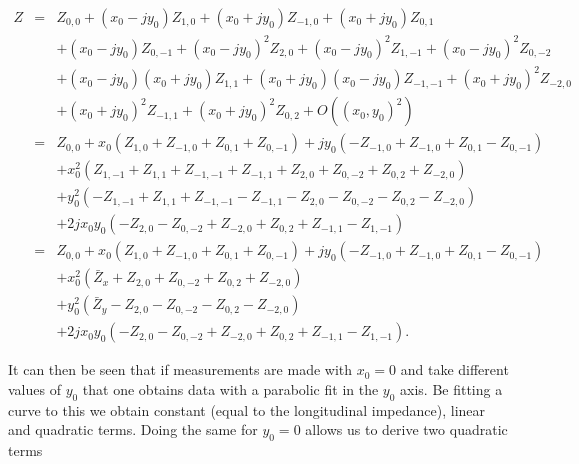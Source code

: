 \begin{align}
Z &=&Z_{0,0} +  \left( x_{0} - jy_{0} \right) Z_{1,0} + \left( x_{0} + jy_{0} \right)  Z_{-1,0} + \left( x_{0} + jy_{0} \right) Z_{0,1} \nonumber \\
   &   &+ \left( x_{0} - jy_{0} \right) Z_{0,-1} + \left( x_{0} - jy_{0} \right)^{2} Z_{2,0} + \left( x_{0} - jy_{0} \right)^{2} Z_{1,-1} + \left( x_{0} - jy_{0} \right) ^{2}Z_{0,-2} \nonumber \\
   &   &+\left( x_{0} - jy_{0} \right) \left( x_{0} + jy_{0} \right) Z_{1,1} + \left( x_{0} + jy_{0} \right)\left( x_{0} - jy_{0} \right) Z_{-1,-1} + \left( x_{0} + jy_{0} \right)^{2}Z_{-2,0} \nonumber \\
   &   &+\left( x_{0} + jy_{0} \right)^{2} Z_{-1,1} + \left( x_{0} + jy_{0} \right)^{2}Z_{0,2} + O\left( \left(x_{0},y_{0} \right)^{2} \right) \nonumber \\
   &=&Z_{0,0} + x_{0}\left( Z_{1,0}+Z_{-1,0}+Z_{0,1}+Z_{0,-1} \right) +jy_{0} \left( -Z_{-1,0} + Z_{-1,0} + Z_{0,1} - Z_{0,-1} \right) \nonumber \\
   &   &+x_{0}^{2} \left(  Z_{1,-1}+Z_{1,1}+Z_{-1,-1}+Z_{-1,1} + Z_{2,0} + Z_{0,-2} + Z_{0,2} + Z_{-2,0} \right) \nonumber \\
   &   &+y_{0}^{2} \left(  -Z_{1,-1}+Z_{1,1}+Z_{-1,-1}-Z_{-1,1} - Z_{2,0} - Z_{0,-2} - Z_{0,2} - Z_{-2,0} \right) \nonumber \\
   &   &+2jx_{0}y_{0}\left( -Z_{2,0} - Z_{0,-2} + Z_{-2,0} + Z_{0,2} + Z_{-1,1} - Z_{1,-1} \right) \nonumber \\
   &=&Z_{0,0} + x_{0}\left( Z_{1,0}+Z_{-1,0}+Z_{0,1}+Z_{0,-1} \right) +jy_{0} \left( -Z_{-1,0} + Z_{-1,0} + Z_{0,1} - Z_{0,-1} \right) \nonumber \\
   &   &+x_{0}^{2} \left( \bar{Z}_{x} + Z_{2,0} + Z_{0,-2} + Z_{0,2} + Z_{-2,0} \right) \nonumber \\
   &   &+y_{0}^{2} \left( \bar{Z}_{y} - Z_{2,0} - Z_{0,-2} - Z_{0,2} - Z_{-2,0} \right) \nonumber \\
   &   &+2jx_{0}y_{0}\left( -Z_{2,0} - Z_{0,-2} + Z_{-2,0} + Z_{0,2} + Z_{-1,1} - Z_{1,-1} \right).
\label{eqn:gen_single_wire}
\end{align}

It can then be seen that if measurements are made with $x_{0} = 0$ and take different values of $y_{0}$ that one obtains data with a parabolic fit in the $y_{0}$ axis. Be fitting a curve to this we obtain constant (equal to the longitudinal impedance), linear and quadratic terms. Doing the same for $y_{0}=0$ allows us to derive two quadratic terms

